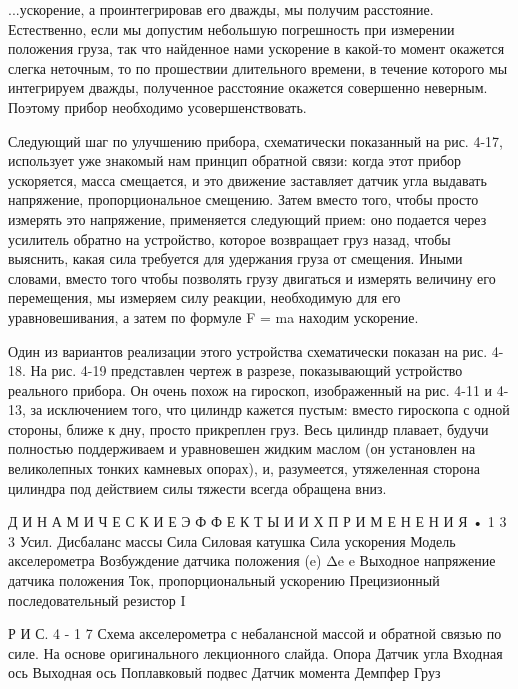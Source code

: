 \documentclass[10pt,oneside]{article}
\begin{document}
...ускорение, а проинтегрировав его дважды, мы получим расстояние. Естественно, если мы допустим небольшую погрешность при измерении положения груза, так что найденное нами ускорение в какой-то момент окажется слегка неточным, то по прошествии длительного времени, в течение которого мы интегрируем дважды, полученное расстояние окажется совершенно неверным. Поэтому прибор необходимо усовершенствовать.\par

Следующий шаг по улучшению прибора, схематически показанный на рис. 4-17, использует уже знакомый нам принцип обратной связи: когда этот прибор ускоряется, масса смещается, и это движение заставляет датчик угла выдавать напряжение, пропорциональное смещению. Затем вместо того, чтобы просто измерять это напряжение, применяется следующий прием: оно подается через усилитель обратно на устройство, которое возвращает груз назад, чтобы выяснить, какая сила требуется для удержания груза от смещения. Иными словами, вместо того чтобы позволять грузу двигаться и измерять величину его перемещения, мы измеряем силу реакции, необходимую для его уравновешивания, а затем по формуле F = ma находим ускорение.\par

Один из вариантов реализации этого устройства схематически показан на рис. 4-18. На рис. 4-19 представлен чертеж в разрезе, показывающий устройство реального прибора. Он очень похож на гироскоп, изображенный на рис. 4-11 и 4-13, за исключением того, что цилиндр кажется пустым: вместо гироскопа с одной стороны, ближе к дну, просто прикреплен груз. Весь цилиндр плавает, будучи полностью поддерживаем и уравновешен жидким маслом (он установлен на великолепных тонких камневых опорах), и, разумеется, утяжеленная сторона цилиндра под действием силы тяжести всегда обращена вниз.\par

Д И Н А М И Ч Е С К И Е  Э Ф Ф Е К Т Ы  И  И Х  П Р И М Е Н Е Н И Я • 1 3 3 Усил. Дисбаланс массы Сила Силовая катушка Сила ускорения Модель акселерометра Возбуждение датчика положения (e) Δe e Выходное напряжение датчика положения Ток, пропорциональный ускорению Прецизионный последовательный резистор I\par

Р И С.  4 - 1 7 Схема акселерометра с небалансной массой и обратной связью по силе. На основе оригинального лекционного слайда. Опора Датчик угла Входная ось Выходная ось Поплавковый подвес Датчик момента Демпфер Груз\par
\end{document}
